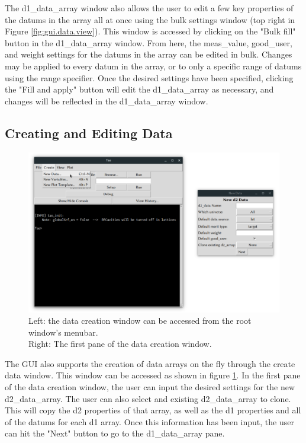 The d1_data_array window also allows the user to edit a few key properties of the datums in the array all at once using the bulk settings window (top right in Figure \ref{fig:gui.data.view}).
This window is accessed by clicking on the "Bulk fill" button in the d1_data_array window.
From here, the meas_value, good_user, and weight settings for the datums in the array can be edited in bulk.
Changes may be applied to every datum in the array, or to only a specific range of datums using the range specifier.
Once the desired settings have been specified, clicking the "Fill and apply" button will edit the d1_data_array as necessary, and changes will be reflected in the d1_data_array window.

\subsection{Creating and Editing Data}
\label{s:gui.data.edit}

\begin{figure}
\centering
\includegraphics[width=12cm]{figures/create_d2.pdf}
\caption[Data creation window.]{Left: the data creation window can be accessed from the root window's menubar. \\
Right: The first pane of the data creation window.}
\label{fig:gui.create.data.d2}
\end{figure}

The GUI also supports the creation of data arrays on the fly through the create data window.
This window can be accessed as shown in figure \ref{fig:gui.create.data.d2}.
In the first pane of the data creation window, the user can input the desired settings for the new d2_data_array.
The user can also select and existing d2_data_array to clone.
This will copy the d2 properties of that array, as well as the d1 properties and all of the datums for each d1 array.
Once this information has been input, the user can hit the "Next" button to go to the d1_data_array pane.

